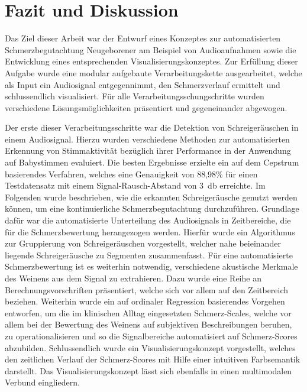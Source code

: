\chapter{Fazit und Diskussion}

Das Ziel dieser Arbeit war der Entwurf eines Konzeptes zur automatisierten Schmerzbegutachtung Neugeborener am Beispiel von Audioaufnahmen sowie die Entwicklung eines entsprechenden Visualisierungskonzeptes. Zur Erfüllung dieser Aufgabe wurde eine modular aufgebaute Verarbeitungskette ausgearbeitet, welche als Input ein Audiosignal entgegennimmt, den Schmerzverlauf ermittelt und schlussendlich visualisiert. Für alle Verarbeitungsschungschritte wurden verschiedene Lösungsmöglichkeiten präsentiert und gegeneinander abgewogen.

Der erste dieser Verarbeitungsschritte war die Detektion von Schreigeräuschen in einem Audiosignal. Hierzu wurden verschiedene Methoden zur automatisierten Erkennung von Stimmaktivität bezüglich ihrer Performance in der Anwendung auf Babystimmen evaluiert. Die besten Ergebnisse erzielte ein auf dem Cepstrum basierendes Verfahren, welches eine Genauigkeit von 88,98\% für einen Testdatensatz mit einem Signal-Rausch-Abstand von \SI{3}{\decibel} erreichte. Im Folgenden wurde beschrieben, wie die erkannten Schreigeräusche genutzt werden können, um eine kontinuierliche Schmerzbegutachtung durchzuführen. Grundlage dafür war die automatisierte Unterteilung des Audiosignals in Zeitbereiche, die für die Schmerzbewertung herangezogen werden. Hierfür wurde ein Algorithmus zur Gruppierung von Schreigeräuschen vorgestellt, welcher nahe beieinander liegende Schreigeräusche zu Segmenten zusammenfasst. Für eine automatisierte Schmerzbewertung ist es weiterhin notwendig, verschiedene akustische Merkmale des Weinens aus dem Signal zu extrahieren. Dazu wurde eine Reihe an Berechnungsvorschriften präsentiert, welche sich vor allem auf den Zeitbereich beziehen. Weiterhin wurde ein auf ordinaler Regression basierendes Vorgehen entworfen, um die im klinischen Alltag eingesetzten Schmerz-Scales, welche vor allem bei der Bewertung des Weinens auf subjektiven Beschreibungen beruhen, zu operationalisieren und so die Signalbereiche automatisiert auf Schmerz-Scores abzubilden. Schlussendlich wurde ein Visualisierungskonzept vorgestellt, welches den zeitlichen Verlauf der Schmerz-Scores mit Hilfe einer intuitiven Farbsemantik darstellt. Das Visualisierungskonzept lässt sich ebenfalls in einen multimodalen Verbund eingliedern.

